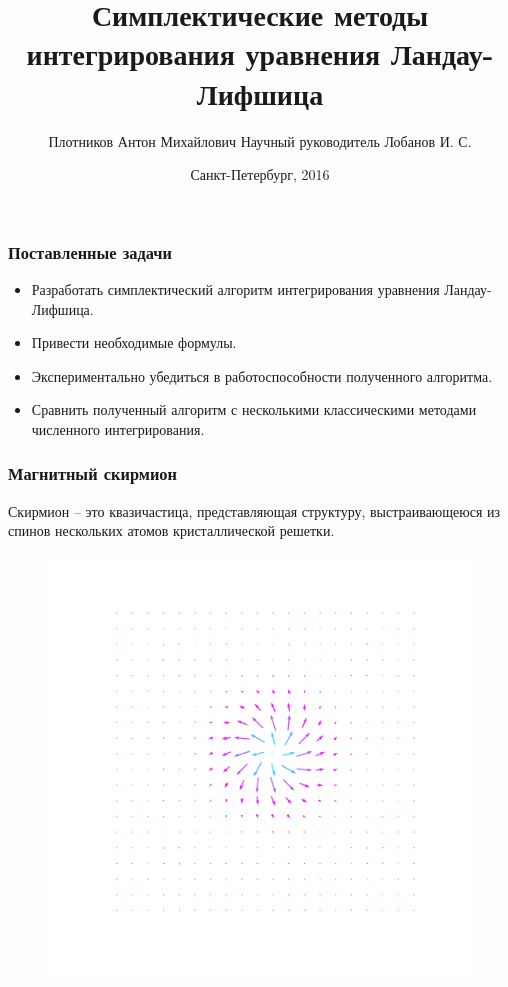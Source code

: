 \documentclass[t]{beamer}
\title[Симплектические методы интегрирования ур-я Ландау-Лифшица]{%
    Симплектические методы интегрирования\linebreak
        уравнения Ландау-Лифшица
}
\author[Плотников Антон]{Плотников Антон Михайлович\linebreak\footnotesize
    Научный руководитель Лобанов И. С.}
\institute{Кафедра высшей математики}
\date{Санкт-Петербург, 2016}
\begin{document}
\ITMOtitlepage

\begin{frame}
    \frametitle{Поставленные задачи}
    \begin{itemize}
        \item Разработать симплектический алгоритм интегрирования уравнения
    Ландау-Лифшица.
        \item Привести необходимые формулы.
        \item Экспериментально убедиться в работоспособности полученного
            алгоритма.
        \item Сравнить полученный алгоритм с несколькими классическими методами
            численного интегрирования.
    \end{itemize}

\end{frame}

\begin{frame}
    \frametitle{Магнитный скирмион}
    Скирмион -- это квазичастица, представляющая структуру, выстраивающеюся из
    спинов нескольких атомов кристаллической решетки.
    \begin{figure}
        \includegraphics[width=0.5\linewidth]{skyrmion4}
    \end{figure}
\end{frame}
\end{document}

